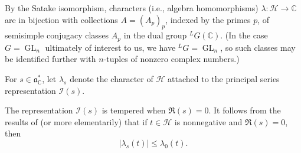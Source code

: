\documentclass[reqno]{amsart}
\DeclareMathOperator{\GL}{GL}
\theoremstyle{plain} \newtheorem{theorem} {Theorem}
\theoremstyle{definition} \newtheorem{definition} [theorem] {Definition}
\theoremstyle{itplain} %
\numberwithin{equation}{section}
\numberwithin{theorem}{section}
\renewcommand{\leq}{\leqslant}
\begin{document}
By the Satake isomorphism, characters (i.e., algebra homomorphisms) $\lambda : \mathcal{H} \rightarrow \mathbb{C}$ are in bijection with collections $A = (A_p)_p$, indexed by the primes $p$, of semisimple conjugacy classes $A_p$ in the dual group ${}^L G(\mathbb{C})$.  (In the case $G = \GL_n$ ultimately of interest to us, we have ${}^L G = \GL_n$, so such classes may be identified further with $n$-tuples of nonzero complex numbers.)

For $s \in \mathfrak{a}_{\mathbb{C}}^*$, let $\lambda_s$ denote the character of $\mathcal{H}$ attached to the principal series representation $\mathcal{I}(s)$.

The representation $\mathcal{I}(s)$ is tempered when $\Re(s) = 0$.  It follows from the results of \cite{MR946351} (or more elementarily) that if $t \in \mathcal{H}$ is nonnegative and $\Re(s) = 0$,  then
\begin{equation}\label{eq:lambd-leq-lambd}
|\lambda_s(t)| \leq \lambda_0(t).
\end{equation}
\end{document}
